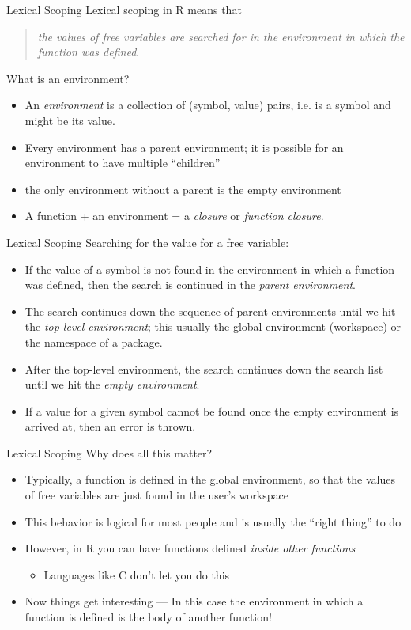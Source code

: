 \documentclass[aspectratio=169]{beamer}
\begin{document}
\begin{frame}[fragile]{Lexical Scoping}
Lexical scoping in R means that
\begin{quote}
\textit{the values of free variables
  are searched for in the environment in which the function was
  defined}.
\end{quote}
What is an environment?
\begin{itemize}
\item
An \textit{environment} is a collection of (symbol, value) pairs,
i.e.  is a symbol and  might be its value.
\item
Every environment has a parent environment; it is possible for an
environment to have multiple ``children''
\item
the only environment without a parent is the empty environment
\item
A function + an environment = a \textit{closure} or \textit{function
  closure}.
\end{itemize}
\end{frame}


\begin{frame}{Lexical Scoping}
Searching for the value for a free variable:
\begin{itemize}
\item
If the value of a symbol is not found in the environment in which a
function was defined, then the search is continued in the
\textit{parent environment}.
\item
The search continues down the sequence of parent environments until we
hit the \textit{top-level environment}; this usually the global
environment (workspace) or the namespace of a package.
\item
After the top-level environment, the search continues down the search
list until we hit the \textit{empty environment}.
\item
If a value for a given symbol cannot be found once the empty
environment is arrived at, then an error is thrown.
\end{itemize}
\end{frame}


\begin{frame}{Lexical Scoping}
Why does all this matter?
\begin{itemize}
\item
Typically, a function is defined in the global environment, so that
the values of free variables are just found in the user's workspace
\item
This behavior is logical for most people and is usually the ``right
thing'' to do
\item
However, in R you can have functions defined \textit{inside other
  functions}
\begin{itemize}
\item
Languages like C don't let you do this
\end{itemize}
\item
Now things get interesting --- In this case the environment in which a
function is defined is the body of another function!
\end{itemize}
\end{frame}
\end{document}

